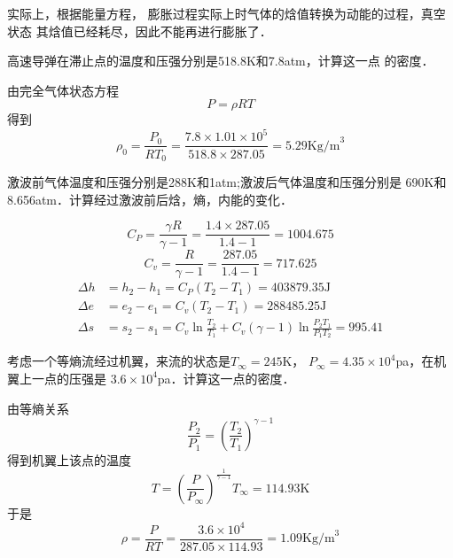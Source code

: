 实际上，根据能量方程， 膨胀过程实际上时气体的焓值转换为动能的过程，真空状态
其焓值已经耗尽，因此不能再进行膨胀了．
\begin{example}
	高速导弹在滞止点的温度和压强分别是518.8K和7.8atm，计算这一点
	的密度．

	由完全气体状态方程
	\[
		P=\rho R T
	\]
	得到
	\[
		\rho_0 =\frac{P_0}{R T_0 }=\frac{7.8\times 1.01\times 10^5 }
		{518.8\times 287.05}=5.29 \text{Kg/m}^3
	\]
\end{example}

\begin{example}
	激波前气体温度和压强分别是288K和1atm;激波后气体温度和压强分别是
	690K和8.656atm．计算经过激波前后焓，熵，内能的变化．

	\[
		C_P=\frac{\gamma R}{\gamma-1}=\frac{1.4\times 287.05}{1.4-1}=1004.675
	\]
	\[
		C_v=\frac{R}{\gamma-1}=\frac{287.05}{1.4-1}=717.625
	\]
	\begin{equation*}
		\begin{split}
			\Delta h & =h_2-h_1=C_P(T_2-T_1)=403879.35\text{J}        \\
			\Delta e & =e_2-e_1=C_v(T_2-T_1)=288485.25\text{J}        \\
			\Delta s & =s_2-s_1=C_v \ln \frac{T_2}{T_1}+C_v(\gamma-1)
			\ln \frac{P_2T_1}{P_1T_2}=995.41
		\end{split}
	\end{equation*}
\end{example}

\begin{example}
	考虑一个等熵流经过机翼，来流的状态是$T_\infty=245$K，
	$P_\infty=4.35\times 10^4 $pa，在机翼上一点的压强是
	$3.6\times 10^4 $pa．计算这一点的密度．

	由等熵关系
	\[
		\frac{P_2}{P_1}=\left(\frac{T_2}{T_1}\right)^{\gamma-1}
	\]
	得到机翼上该点的温度
	\[
		T=(\frac{P}{P_\infty})^{\frac{1}{\gamma-1}}T_\infty=114.93\text{K}
	\]
	于是
	\[
		\rho =\frac{P}{RT}=\frac{3.6\times 10^4}{287.05\times 114.93}=1.09
		\text{Kg/m}^3
	\]
\end{example}

